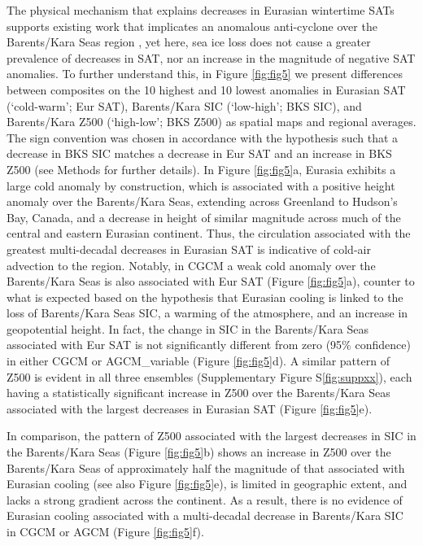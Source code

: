 \documentclass{nature}
\begin{document}
The physical mechanism that explains decreases in Eurasian wintertime SATs supports existing work that implicates an anomalous anti-cyclone over the Barents/Kara Seas region \cite{honda09,petoukhov10,mori14}, yet here, sea ice loss does not cause a greater prevalence of decreases in SAT, nor an increase in the magnitude of negative SAT anomalies. To further understand this, in Figure \ref{fig:fig5} we present differences between composites on the 10 highest and 10 lowest anomalies in Eurasian SAT (`cold-warm'; Eur SAT), Barents/Kara SIC (`low-high'; BKS SIC), and Barents/Kara Z500 (`high-low'; BKS Z500) as spatial maps and regional averages. The sign convention was chosen in accordance with the hypothesis such that a decrease in BKS SIC matches a decrease in Eur SAT and an increase in BKS Z500 (see Methods for further details). In Figure \ref{fig:fig5}a, Eurasia exhibits a large cold anomaly by construction, which is associated with a positive height anomaly over the Barents/Kara Seas, extending across Greenland to Hudson's Bay, Canada, and a decrease in height of similar magnitude across much of the central and eastern Eurasian continent. Thus, the circulation associated with the greatest multi-decadal decreases in Eurasian SAT is indicative of cold-air advection to the region. Notably, in CGCM a weak cold anomaly over the Barents/Kara Seas is also associated with Eur SAT (Figure \ref{fig:fig5}a), counter to what is expected based on the hypothesis that Eurasian cooling is linked to the loss of Barents/Kara Seas SIC, a warming of the atmosphere, and an increase in geopotential height. In fact, the change in SIC in the Barents/Kara Seas associated with Eur SAT is not significantly different from zero (95\% confidence) in either CGCM or AGCM\_variable (Figure \ref{fig:fig5}d). A similar pattern of Z500 is evident in all three ensembles (Supplementary Figure S\ref{fig:suppxx}), each having a statistically significant increase in Z500 over the Barents/Kara Seas associated with the largest decreases in Eurasian SAT (Figure \ref{fig:fig5}e). %

In comparison, the pattern of Z500 associated with the largest decreases in SIC in the Barents/Kara Seas (Figure \ref{fig:fig5}b) shows an increase in Z500 over the Barents/Kara Seas of approximately half the magnitude of that associated with Eurasian cooling (see also Figure \ref{fig:fig5}e), is limited in geographic extent, and lacks a strong gradient across the continent. As a result, there is no evidence of Eurasian cooling associated with a multi-decadal decrease in Barents/Kara SIC in CGCM or AGCM (Figure \ref{fig:fig5}f). %
\end{document}
